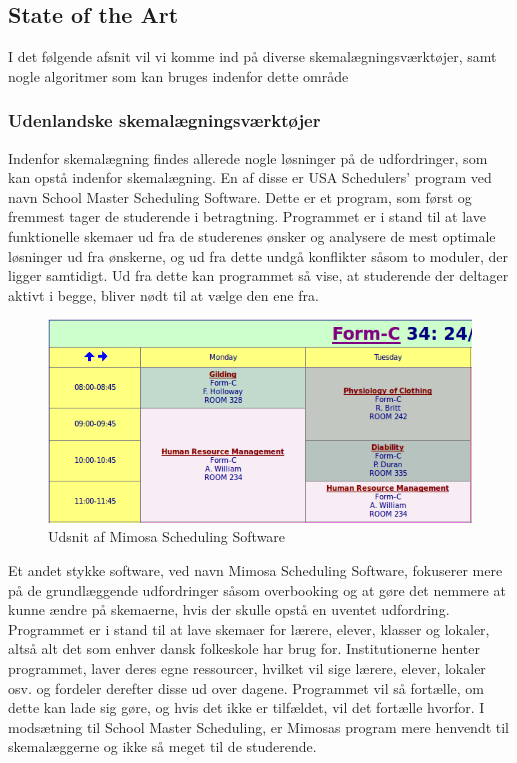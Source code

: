 \subsection{State of the Art}
I det følgende afsnit vil vi komme ind på diverse skemalægningsværktøjer, samt nogle algoritmer som kan bruges indenfor dette område
\label{sota}

\subsubsection{Udenlandske skemalægningsværktøjer}
Indenfor skemalægning findes allerede nogle løsninger på de udfordringer, som kan opstå indenfor skemalægning. En af disse er USA Schedulers' program ved navn School Master Scheduling Software\cite{USAS}. Dette er et program, som først og fremmest tager de studerende i betragtning. Programmet er i stand til at lave funktionelle skemaer ud fra de studerenes ønsker og analysere de mest optimale løsninger ud fra ønskerne, og ud fra dette undgå konflikter såsom to moduler, der ligger samtidigt. Ud fra dette kan programmet så vise, at studerende der deltager aktivt i begge, bliver nødt til at vælge den ene fra.
\begin{figure}[h!]
	\centering
	\includegraphics[width=1.0\textwidth]{../Billeder/MimosaSoftware.png}
	\caption{Udsnit af Mimosa Scheduling Software\cite{mimosaPicture}}
	\label{fig:Mimosa}
\end{figure}
\FloatBarrier
Et andet stykke software, ved navn Mimosa Scheduling Software\cite{Mimosa}, fokuserer mere på de grundlæggende udfordringer såsom overbooking og at gøre det nemmere at kunne ændre på skemaerne, hvis der skulle opstå en uventet udfordring. Programmet er i stand til at lave skemaer for lærere, elever, klasser og lokaler, altså alt det som enhver dansk folkeskole har brug for. Institutionerne henter programmet, laver deres egne ressourcer, hvilket vil sige lærere, elever, lokaler osv. og fordeler derefter disse ud over dagene. Programmet vil så fortælle, om dette kan lade sig gøre, og hvis det ikke er tilfældet, vil det fortælle hvorfor\cite{MimosaTutorial}. I modsætning til School Master Scheduling, er Mimosas program mere henvendt til skemalæggerne og ikke så meget til de studerende. 


